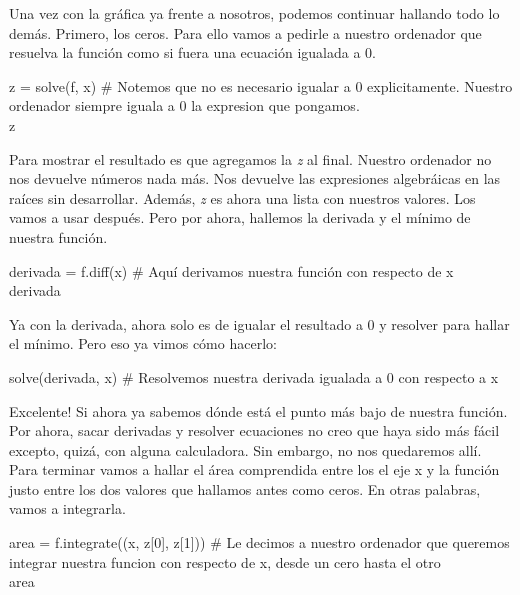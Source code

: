 \documentclass[10pt,letterpaper]{article}
\newenvironment{Code}
{
\begin{lrbox}{\selvestebox}%
\begin{minipage}{\dimexpr\columnwidth-2\fboxsep\relax}
\fontfamily{\ttdefault}\selectfont
}
{\end{minipage}\end{lrbox}%
\begin{center}
\colorbox{light-gray}{\usebox{\selvestebox}}
\end{center}
}
\begin{document}
\noindent Una vez con la gr\'afica ya frente a nosotros, podemos continuar hallando todo lo dem\'as. Primero, los ceros. Para ello vamos a pedirle a nuestro ordenador que resuelva la funci\'on como si fuera una ecuaci\'on igualada a 0.

\begin{footnotesize}
\begin{Code}
z = solve(f, x) \# Notemos que no es necesario igualar a 0 explicitamente. Nuestro ordenador siempre iguala a 0 la expresion que pongamos.\\
z
\end{Code}
\end{footnotesize}

\noindent Para mostrar el resultado es que agregamos la \emph{z} al final. Nuestro ordenador no nos devuelve n\'umeros nada m\'as. Nos devuelve las expresiones algebr\'aicas en las ra\'ices sin desarrollar. Adem\'as, \emph{z} es ahora una lista con nuestros valores. Los vamos a usar despu\'es. Pero por ahora, hallemos la derivada y el m\'inimo de nuestra funci\'on.

\begin{footnotesize}
\begin{Code}
derivada = f.diff(x) \# Aqu\'i derivamos nuestra funci\'on con respecto de x\\
derivada
\end{Code}
\end{footnotesize}

\noindent Ya con la derivada, ahora solo es de igualar el resultado a 0 y resolver para hallar el m\'inimo. Pero eso ya vimos c\'omo hacerlo:

\begin{footnotesize}
\begin{Code}
solve(derivada, x) \# Resolvemos nuestra derivada igualada a 0 con respecto a x
\end{Code}
\end{footnotesize}

\noindent Excelente! Si ahora ya sabemos d\'onde est\'a el punto m\'as bajo de nuestra funci\'on. Por ahora, sacar derivadas y resolver ecuaciones no creo que haya sido m\'as f\'acil excepto, quiz\'a, con alguna calculadora. Sin embargo, no nos quedaremos all\'i. Para terminar vamos a hallar el \'area comprendida entre los el eje x y la funci\'on justo entre los dos valores que hallamos antes como ceros. En otras palabras, vamos a integrarla.

\begin{footnotesize}
\begin{Code}
area = f.integrate((x, z[0], z[1])) \# Le decimos a nuestro ordenador que queremos integrar nuestra funcion con respecto de x, desde un cero hasta el otro\\
area
\end{Code}
\end{footnotesize}
\end{document}
